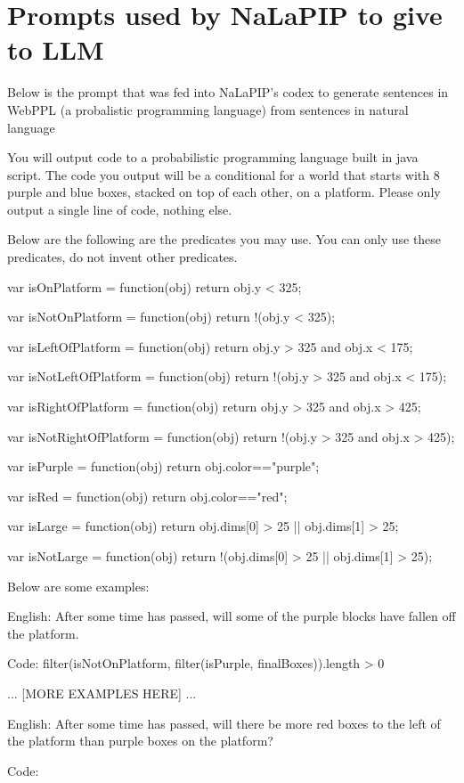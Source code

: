 \documentclass[10pt,letterpaper]{article}
\begin{document}
\newpage
\section{Prompts used by NaLaPIP to give to LLM}
\label{app:NaLaPIPLLM_prompts}

Below is the prompt that was fed into NaLaPIP's codex to generate sentences in WebPPL (a probalistic programming language) from sentences in natural language

\begin{displayquote}
    You will output code to a probabilistic programming language built in java script. The code you output will be a conditional for a world that starts with 8 purple and blue boxes, stacked on top of each other, on a platform. Please only output a single line of code, nothing else.

Below are the following are the predicates you may use. You can only use these predicates, do not invent other predicates.

var isOnPlatform = function(obj) {{
    return obj.y < 325;
  }}
  
  var isNotOnPlatform = function(obj) {{
    return !(obj.y < 325);
  }}
  
  var isLeftOfPlatform = function(obj) {{
    return obj.y > 325 and  obj.x < 175;
  }}
  
  var isNotLeftOfPlatform = function(obj) {{
    return !(obj.y > 325 and obj.x < 175);
  }}
  
  var isRightOfPlatform = function(obj) {{
    return obj.y > 325 and obj.x > 425;
  }}
  
  var isNotRightOfPlatform = function(obj) {{
    return !(obj.y > 325 and obj.x > 425);
  }}
  
  var isPurple = function(obj) {{
    return obj.color=="purple";
  }}
  
  var isRed = function(obj) {{
    return obj.color=="red";
  }}
  
  var isLarge = function(obj) {{
    return obj.dims[0] > 25 || obj.dims[1] > 25;
  }}
  
  var isNotLarge = function(obj) {{
    return !(obj.dims[0] > 25 || obj.dims[1] > 25);
  }}

  Below are some examples:

  English: After some time has passed, will some of the purple blocks have fallen off the platform. 
  
  Code: filter(isNotOnPlatform, filter(isPurple, finalBoxes)).length > 0
  
  ... [MORE EXAMPLES HERE] ...
  
  English: After some time has passed, will there be more red boxes to the left of the platform than purple boxes on the platform?
  
  Code: 
\end{displayquote}
\end{document}
